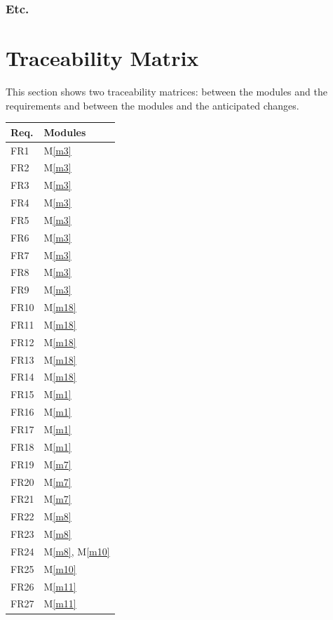 \documentclass[12pt, titlepage]{article}
\newcommand{\mref}[1]{M\ref{#1}}
\begin{document}
\subsubsection{Etc.}

\section{Traceability Matrix} \label{SecTM}

This section shows two traceability matrices: between the modules and the
requirements and between the modules and the anticipated changes.

\begin{table}[H]
	\centering
	\begin{tabular}{p{} p{}}
		\toprule
		\textbf{Req.} & \textbf{Modules}\\
		\midrule
		FR1 & \mref{m3}\\
		FR2 & \mref{m3}\\
		FR3 & \mref{m3}\\
		FR4 & \mref{m3}\\
		FR5 & \mref{m3}\\
		FR6 & \mref{m3}\\
		FR7 & \mref{m3}\\
		FR8 & \mref{m3}\\
		FR9 & \mref{m3}\\
		FR10 & \mref{m18}\\
		FR11 & \mref{m18}\\
		FR12 & \mref{m18}\\
		FR13 & \mref{m18}\\
		FR14 & \mref{m18}\\
		FR15 & \mref{m1}\\
		FR16 & \mref{m1}\\
		FR17 & \mref{m1}\\
		FR18 & \mref{m1}\\
		FR19 & \mref{m7}\\
		FR20 & \mref{m7}\\
		FR21 & \mref{m7}\\
		FR22 & \mref{m8}\\
		FR23 & \mref{m8}\\
		FR24 & \mref{m8}, \mref{m10}\\
		FR25 & \mref{m10}\\
		FR26 & \mref{m11}\\
		FR27 & \mref{m11}\\

\end{tabular}
\end{table}
\end{document}
